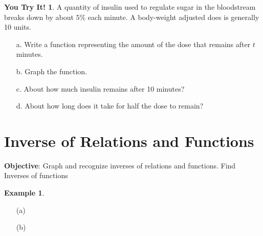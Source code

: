 \documentclass{report}
\theoremstyle{definition}
\newtheorem{example}{\bf Example}
\newtheorem{youtry}{\bf You Try It!}
\begin{document}
\begin{youtry}
A quantity of insulin used to regulate sugar in the bloodstream breaks down by about $5\%$ each minute. A body-weight adjusted does is generally 10 units.
\end{youtry}
\begin{itemize}
\item[a.] Write a function representing the amount of the dose that remains after $t$ minutes.
\vspace{1.5cm}
\item[b.] Graph the function.
\vspace{1.5cm}
\item[c.] About how much insulin remains after 10 minutes?
\vspace{1.5cm}
\item[d.] About how long does it take for half the dose to remain?
\end{itemize}
\vfill

 \noindent{} \hfill 

 \newpage

 \section{Inverse of Relations and Functions }
 \indent\hfill\small\noindent \textbf{Objective}: Graph and recognize inverses of relations and functions. Find Inverses of functions\normalsize\\
 \setcounter{example}{0}
 \setcounter{definition}{0}

\vspace{-0.5cm}

 \begin{example}

 \end{example}
\begin{minipage}[t]{0.45\linewidth}
	\begin{itemize}
		\item[(a)] 
	\end{itemize}
\end{minipage}
\begin{minipage}[t]{0.45\linewidth}
	\begin{itemize}
		\item[(b)] 
	\end{itemize}
\end{minipage}
\end{document}

